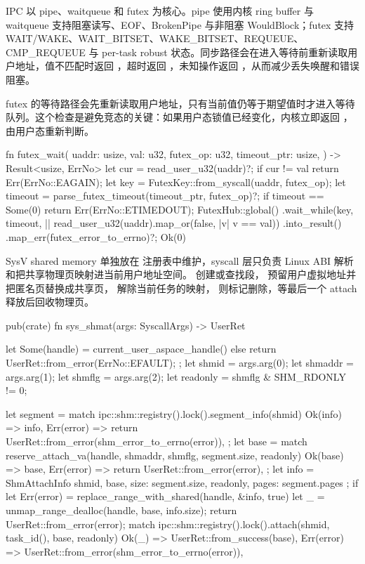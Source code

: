 IPC 以 pipe、waitqueue 和 futex 为核心。pipe 使用内核 ring buffer 与 waitqueue 支持阻塞读写、EOF、BrokenPipe 与非阻塞 WouldBlock；futex 支持 WAIT/WAKE、WAIT\_BITSET、WAKE\_BITSET、REQUEUE、CMP\_REQUEUE 与 per-task robust 状态。同步路径会在进入等待前重新读取用户地址，值不匹配时返回 ，超时返回 ，未知操作返回 ，从而减少丢失唤醒和错误阻塞。


futex 的等待路径会先重新读取用户地址，只有当前值仍等于期望值时才进入等待队列。这个检查是避免竞态的关键：如果用户态锁值已经变化，内核立即返回 ，由用户态重新判断。

\begin{rustcode}
fn futex_wait(
    uaddr: usize,
    val: u32,
    futex_op: u32,
    timeout_ptr: usize,
) -> Result<usize, ErrNo> {
    let cur = read_user_u32(uaddr)?;
    if cur != val {
        return Err(ErrNo::EAGAIN);
    }
    let key = FutexKey::from_syscall(uaddr, futex_op);
    let timeout = parse_futex_timeout(timeout_ptr, futex_op)?;
    if timeout == Some(0) {
        return Err(ErrNo::ETIMEDOUT);
    }
    FutexHub::global()
        .wait_while(key, timeout, || read_user_u32(uaddr).map_or(false, |v| v == val))
        .into_result()
        .map_err(futex_error_to_errno)?;
    Ok(0)
}
\end{rustcode}

SysV shared memory 单独放在  注册表中维护，syscall 层只负责 Linux ABI 解析和把共享物理页映射进当前用户地址空间。 创建或查找段， 预留用户虚拟地址并把匿名页替换成共享页， 解除当前任务的映射， 则标记删除，等最后一个 attach 释放后回收物理页。

\begin{rustcode}
pub(crate) fn sys_shmat(args: SyscallArgs) -> UserRet {
    let Some(handle) = current_user_aspace_handle() else {
        return UserRet::from_error(ErrNo::EFAULT);
    };
    let shmid = args.arg(0);
    let shmaddr = args.arg(1);
    let shmflg = args.arg(2);
    let readonly = shmflg & SHM_RDONLY != 0;

    let segment = match ipc::shm::registry().lock().segment_info(shmid) {
        Ok(info) => info,
        Err(error) => return UserRet::from_error(shm_error_to_errno(error)),
    };
    let base = match reserve_attach_va(handle, shmaddr, shmflg, segment.size, readonly) {
        Ok(base) => base,
        Err(error) => return UserRet::from_error(error),
    };
    let info = ShmAttachInfo { shmid, base, size: segment.size,
                               readonly, pages: segment.pages };
    if let Err(error) = replace_range_with_shared(handle, &info, true) {
        let _ = unmap_range_dealloc(handle, base, info.size);
        return UserRet::from_error(error);
    }
    match ipc::shm::registry().lock().attach(shmid, task_id(), base, readonly) {
        Ok(_) => UserRet::from_success(base),
        Err(error) => UserRet::from_error(shm_error_to_errno(error)),
    }
}
\end{rustcode}

